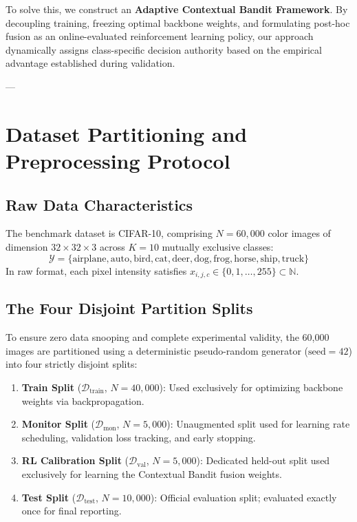 \documentclass[10pt,journal,compsoc]{IEEEtran}
\begin{document}
To solve this, we construct an \textbf{Adaptive Contextual Bandit Framework}. By decoupling training, freezing optimal backbone weights, and formulating post-hoc fusion as an online-evaluated reinforcement learning policy, our approach dynamically assigns class-specific decision authority based on the empirical advantage established during validation.

---

\section{Dataset Partitioning and Preprocessing Protocol}

\subsection{Raw Data Characteristics}
The benchmark dataset is CIFAR-10, comprising $N = 60,000$ color images of dimension $32 \times 32 \times 3$ across $K = 10$ mutually exclusive classes:
\begin{equation}
\mathcal{Y} = \{\text{airplane}, \text{auto}, \text{bird}, \text{cat}, \text{deer}, \text{dog}, \text{frog}, \text{horse}, \text{ship}, \text{truck}\}
\end{equation}
In raw format, each pixel intensity satisfies $x_{i,j,c} \in \{0, 1, \dots, 255\} \subset \mathbb{N}$.

\subsection{The Four Disjoint Partition Splits}
To ensure zero data snooping and complete experimental validity, the 60,000 images are partitioned using a deterministic pseudo-random generator ($\text{seed} = 42$) into four strictly disjoint splits:
\begin{enumerate}
    \item \textbf{Train Split} ($\mathcal{D}_{\text{train}}$, $N = 40,000$): Used exclusively for optimizing backbone weights via backpropagation.
    \item \textbf{Monitor Split} ($\mathcal{D}_{\text{mon}}$, $N = 5,000$): Unaugmented split used for learning rate scheduling, validation loss tracking, and early stopping.
    \item \textbf{RL Calibration Split} ($\mathcal{D}_{\text{val}}$, $N = 5,000$): Dedicated held-out split used exclusively for learning the Contextual Bandit fusion weights.
    \item \textbf{Test Split} ($\mathcal{D}_{\text{test}}$, $N = 10,000$): Official evaluation split; evaluated exactly once for final reporting.
\end{enumerate}
\end{document}
